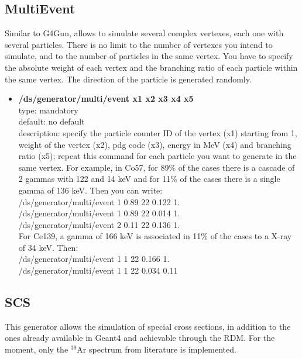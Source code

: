 \documentclass[twocolumn, 10pt]{article}
\begin{document}
\subsection{MultiEvent}

Similar to G4Gun, allows to simulate several complex vertexes, each one with several particles. There is no limit to the
number of vertexes you intend to simulate, and to the number of particles in the same vertex. 
You have to specify the absolute weight of each vertex and the branching ratio of each particle 
within the same vertex. The direction of the particle is generated randomly. 

\begin{itemize}

\item \textbf{/ds/generator/multi/event x1 x2 x3 x4 x5}\\ 
type: mandatory \\
default: no default\\
description: specify the particle counter ID of the vertex (x1) starting from 1, weight of the vertex (x2), pdg code (x3), 
energy in MeV (x4) and branching ratio (x5); repeat this command for
each particle you want to generate in the same vertex. For example, in Co57, for 89\% of the cases
there is a cascade of 2 gammas with 122 and 14 keV and for 11\% of the cases there is a single gamma of 136 keV. Then 
you can write: \\
/ds/generator/multi/event      1  0.89   22   0.122    1.\\
/ds/generator/multi/event      1  0.89   22   0.014    1.\\
/ds/generator/multi/event      2  0.11   22   0.136    1.\\

For Ce139, a gamma of 166 keV is associated in 11\% of the cases to a X-ray of 34 keV. Then:\\ 
/ds/generator/multi/event      1  1   22   0.166    1.\\
/ds/generator/multi/event      1  1   22   0.034    0.11\\

\end{itemize}


\subsection{SCS}
This generator allows the simulation of special cross sections, in addition to the ones already available in Geant4 and achievable through the RDM.
For the moment, only the $^{39}$Ar spectrum from literature is implemented.
\end{document}
